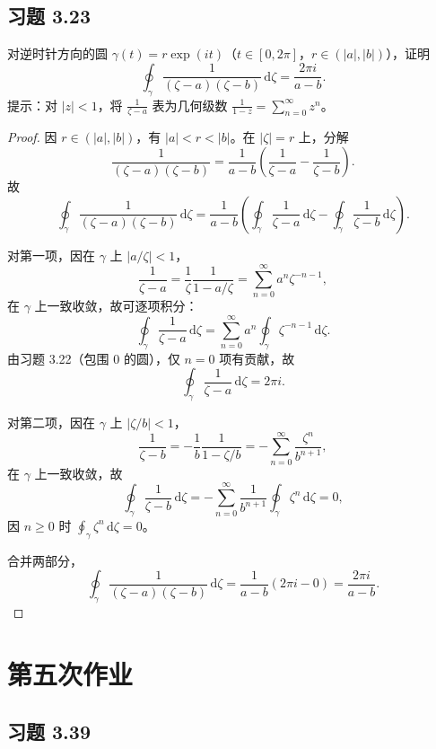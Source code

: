 \documentclass[11pt,a4paper]{article}
\newcommand{\dd}{\mathrm{d}}
\theoremstyle{definition}
\begin{document}
\subsection{习题 3.23}

对逆时针方向的圆 $\gamma(t) = r\exp(it)$（$t \in [0, 2\pi]$，$r \in (|a|, |b|)$），证明
\[
  \oint_\gamma \frac{1}{(\zeta - a)(\zeta - b)} \,\dd\zeta = \frac{2\pi i}{a - b}.
\]
提示：对 $|z| < 1$，将 $\frac{1}{\zeta - a}$ 表为几何级数 $\frac{1}{1-z} = \sum_{n=0}^\infty z^n$。

\begin{proof}
因 $r\in(|a|,|b|)$，有 $|a|<r<|b|$。在 $|\zeta|=r$ 上，分解
\[
  \frac{1}{(\zeta-a)(\zeta-b)}
  =\frac{1}{a-b}\left(\frac{1}{\zeta-a}-\frac{1}{\zeta-b}\right).
\]
故
\[
  \oint_\gamma \frac{1}{(\zeta-a)(\zeta-b)}\,\dd\zeta
  =\frac{1}{a-b}\left(
    \oint_\gamma\frac{1}{\zeta-a}\,\dd\zeta
    -
    \oint_\gamma\frac{1}{\zeta-b}\,\dd\zeta
  \right).
\]

对第一项，因在 $\gamma$ 上 $|a/\zeta|<1$，
\[
  \frac{1}{\zeta-a}
  =\frac{1}{\zeta}\frac{1}{1-a/\zeta}
  =\sum_{n=0}^{\infty}a^n\zeta^{-n-1},
\]
在 $\gamma$ 上一致收敛，故可逐项积分：
\[
  \oint_\gamma\frac{1}{\zeta-a}\,\dd\zeta
  =\sum_{n=0}^{\infty}a^n\oint_\gamma\zeta^{-n-1}\,\dd\zeta.
\]
由习题 3.22（包围 $0$ 的圆），仅 $n=0$ 项有贡献，故
\[
  \oint_\gamma\frac{1}{\zeta-a}\,\dd\zeta=2\pi i.
\]

对第二项，因在 $\gamma$ 上 $|\zeta/b|<1$，
\[
  \frac{1}{\zeta-b}
  =-\frac{1}{b}\frac{1}{1-\zeta/b}
  =-\sum_{n=0}^{\infty}\frac{\zeta^n}{b^{n+1}},
\]
在 $\gamma$ 上一致收敛，故
\[
  \oint_\gamma\frac{1}{\zeta-b}\,\dd\zeta
  =-\sum_{n=0}^{\infty}\frac{1}{b^{n+1}}\oint_\gamma\zeta^n\,\dd\zeta=0,
\]
因 $n\ge0$ 时 $\oint_\gamma\zeta^n\,\dd\zeta=0$。

合并两部分，
\[
  \oint_\gamma \frac{1}{(\zeta-a)(\zeta-b)}\,\dd\zeta
  =\frac{1}{a-b}(2\pi i-0)
  =\frac{2\pi i}{a-b}.
\]
\end{proof}

\section{第五次作业}

\subsection{习题 3.39}
\end{document}
